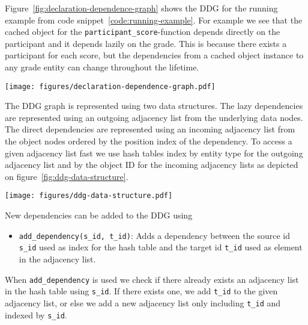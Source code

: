 Figure~\ref{fig:declaration-dependence-graph} shows the DDG for the running example from code snippet~\ref{code:running-example}. For example we see that the cached object for the \verb$participant_score$-function depends directly on the participant and it depends lazily on the grade. This is because there exists a participant for each score, but the dependencies from a cached object instance to any grade entity can change throughout the lifetime.

\begin{figure*}[ht!]
  \centering
  \texttt{[image: figures/declaration-dependence-graph.pdf]}
  \caption{The Declaration Dependence Graph of the running example}
  \label{fig:declaration-dependence-graph}
\end{figure*}

The DDG graph is represented using two data structures. The lazy dependencies are represented using an outgoing adjacency list from the underlying data nodes. The direct dependencies are represented using an incoming adjacency list from the object nodes ordered by the position index of the dependency. To access a given adjacency list fast we use hash tables index by entity type for the outgoing adjacency list and by the object ID for the incoming adjacency lists as depicted on figure~\ref{fig:ddg-data-structure}.

\begin{figure*}[ht!]
  \centering
  \texttt{[image: figures/ddg-data-structure.pdf]}
  \caption{An illustration of the data structure representing the DDG on figure~\ref{fig:declaration-dependence-graph}}
  \label{fig:ddg-data-structure}
\end{figure*}

New dependencies can be added to the DDG using

\begin{itemize}
  \item \verb$add_dependency(s_id, t_id)$: Adds a dependency between the source id \verb$s_id$ used as index for the hash table and the target id \verb$t_id$ used as element in the adjacency list.
\end{itemize}

When \verb$add_dependency$ is used we check if there already exists an adjacency list in the hash table using \verb$s_id$. If there exists one, we add \verb$t_id$ to the given adjacency list, or else we add a new adjacency list only including \verb$t_id$ and indexed by \verb$s_id$.

